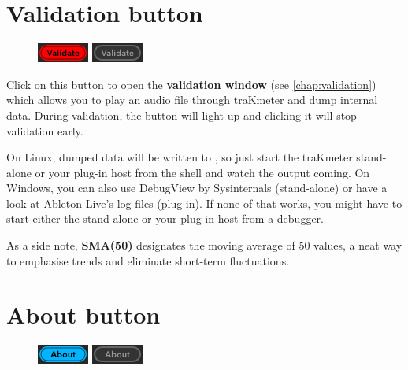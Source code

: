 \section{Validation button}
\label{sec:validation_button}

\begin{figure}
\includegraphics[scale=\screenshotscale,clip]{include/images/button_validate_on.png}
\newline \vspace{-0.9\baselineskip}
\includegraphics[scale=\screenshotscale,clip]{include/images/button_validate_off.png}
\end{figure}

Click on this button to open the \textbf{validation window} (see
\ref{chap:validation}) which allows you to play an audio file through
traKmeter and dump internal data.  During validation, the button will
light up and clicking it will stop validation early.

On Linux, dumped data will be written to , so just start
the traKmeter stand-alone or your plug-in host from the shell and
watch the output coming.  On Windows, you can also use DebugView by
Sysinternals (stand-alone) or have a look at Ableton Live's log files
(plug-in).  If none of that works, you might have to start either the
stand-alone or your plug-in host from a debugger.

As a side note, \textbf{SMA(50)} designates the moving average of 50
values, a neat way to emphasise trends and eliminate short-term
fluctuations.

\section{About button}

\begin{figure}
\includegraphics[scale=\screenshotscale,clip]{include/images/button_about_on.png}
\newline \vspace{-0.9\baselineskip}
\includegraphics[scale=\screenshotscale,clip]{include/images/button_about_off.png}
\end{figure}

